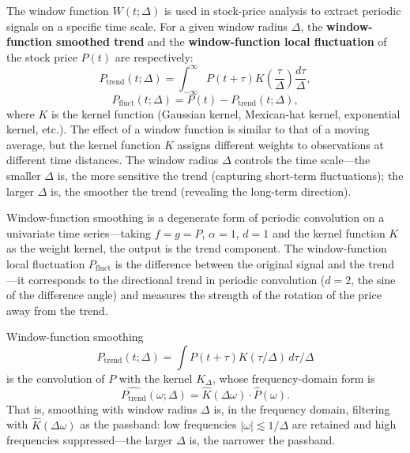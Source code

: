 \begin{definition}\label{def:window_function_stock}
The window function $W(t; \Delta)$ is used in stock-price analysis to extract periodic signals on a specific time scale. For a given window radius $\Delta$, the \textbf{window-function smoothed trend} and the \textbf{window-function local fluctuation} of the stock price $P(t)$ are respectively:
\[
P_{\text{trend}}(t; \Delta) = \int_{-\infty}^{\infty} P(t+\tau) K\left(\frac{\tau}{\Delta}\right) \frac{d\tau}{\Delta},
\]
\[
P_{\text{fluct}}(t; \Delta) = P(t) - P_{\text{trend}}(t; \Delta),
\]
where $K$ is the kernel function (Gaussian kernel, Mexican-hat kernel, exponential kernel, etc.). The effect of a window function is similar to that of a moving average, but the kernel function $K$ assigns different weights to observations at different time distances. The window radius $\Delta$ controls the time scale---the smaller $\Delta$ is, the more sensitive the trend (capturing short-term fluctuations); the larger $\Delta$ is, the smoother the trend (revealing the long-term direction).

Window-function smoothing is a degenerate form of periodic convolution on a univariate time series---taking $f = g = P$, $\alpha = 1$, $d = 1$ and the kernel function $K$ as the weight kernel, the output is the trend component. The window-function local fluctuation $P_{\text{fluct}}$ is the difference between the original signal and the trend---it corresponds to the directional trend in periodic convolution ($d=2$, the sine of the difference angle) and measures the strength of the rotation of the price away from the trend.
\end{definition}

\begin{lemma}\label{ch29_window_spectral}
Window-function smoothing
\[
P_{\text{trend}}(t;\Delta) = \int P(t+\tau) K(\tau/\Delta)\, d\tau/\Delta
\]
is the convolution of $P$ with the kernel $K_\Delta$, whose frequency-domain form is
\[
\widehat{P_{\text{trend}}}(\omega; \Delta) = \hat K(\Delta\omega) \cdot \hat P(\omega).
\]
That is, smoothing with window radius $\Delta$ is, in the frequency domain, filtering with $\hat K(\Delta\omega)$ as the passband: low frequencies $|\omega| \lesssim 1/\Delta$ are retained and high frequencies suppressed---the larger $\Delta$ is, the narrower the passband.
\end{lemma}

